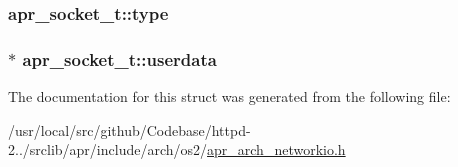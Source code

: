 \subsubsection[{\texorpdfstring{type}{type}}]{ apr\+\_\+socket\+\_\+t\+::type}\hypertarget{structapr__socket__t_a722ea4796e2227c8b0821d1d75ea0b07}{}\label{structapr__socket__t_a722ea4796e2227c8b0821d1d75ea0b07}
\subsubsection[{\texorpdfstring{userdata}{userdata}}]{ $\ast$ apr\+\_\+socket\+\_\+t\+::userdata}\hypertarget{structapr__socket__t_a235046207ad5817e1eab0ab69157cdbd}{}\label{structapr__socket__t_a235046207ad5817e1eab0ab69157cdbd}


The documentation for this struct was generated from the following file\+:\begin{DoxyCompactItemize}
\item 
/usr/local/src/github/\+Codebase/httpd-\/2../srclib/apr/include/arch/os2/\hyperlink{os2_2apr__arch__networkio_8h}{apr\+\_\+arch\+\_\+networkio.\+h}\end{DoxyCompactItemize}
